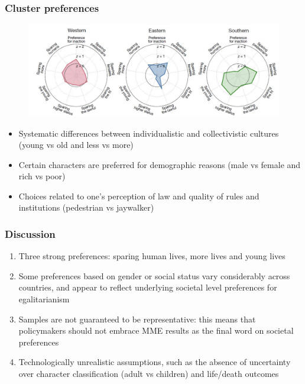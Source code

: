 \documentclass[aspectratio=169]{beamer}
\begin{document}
\begin{frame}
    \frametitle{Cluster preferences}
    \begin{figure}
        \center
        \includegraphics[width=0.8\linewidth]{assets/clusters-mme.jpg}
    \end{figure}
    \bigskip
    \begin{itemize}
        \item Systematic differences between individualistic and collectivistic cultures (young vs old and less vs more)
        \item Certain characters are preferred for demographic reasons (male vs female and rich vs poor)
        \item Choices related to one's perception of law and quality of rules and institutions (pedestrian vs jaywalker)
    \end{itemize}
\end{frame}

\begin{frame}
    \frametitle{Discussion}
    \begin{enumerate}
        \item Three strong preferences: sparing human lives, more lives and young lives
        \item Some preferences based on gender or social status vary considerably across countries, and appear to reflect underlying societal level preferences for egalitarianism
        \item Samples are not guaranteed to be representative: this means that policymakers should not embrace MME results as the final word on societal preferences
        \item Technologically unrealistic assumptions, such as the absence of uncertainty over character classification (adult vs children) and life/death outcomes
    \end{enumerate}
\end{frame}
\end{document}
